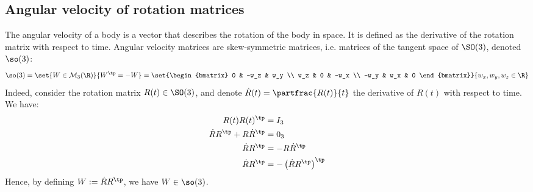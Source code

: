 \subsection{Angular velocity of rotation matrices}
The angular velocity of a body is a vector that describes the rotation of the body in space. It is defined as the derivative of the rotation matrix with respect to time. Angular velocity matrices are skew-symmetric matrices, i.e. matrices of the tangent space of $\SO(3)$, denoted $\so(3)$:
\begin{equation*}
    \so(3) = \set{W\in\mathcal{M}_3(\R)}{W^\tp=-W} = \set{\begin{bmatrix}
        0 & -w_z & w_y \\
        w_z & 0 & -w_x \\
        -w_y & w_x & 0
    \end{bmatrix}}{w_x, w_y, w_z\in\R}
\end{equation*}
Indeed, consider the rotation matrix $R(t)\in\SO(3)$, and denote $\dot R(t) = \partfrac{R(t)}{t}$ the derivative of $R(t)$ with respect to time. We have:
\begin{align*}
    R(t)R(t)^\tp &= I_3 \\
    \dot RR^\tp + R\dot R^\tp &= 0_3 \\
    \dot RR^\tp &= -R\dot R^\tp \\
    \dot RR^\tp &= -\left(\dot RR^\tp\right)^\tp \\
\end{align*}
Hence, by defining $W := \dot RR^\tp$, we have $W\in\so(3)$.

